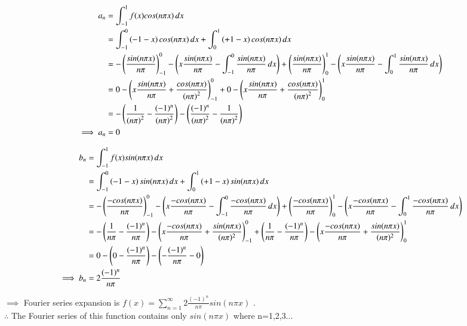 \documentclass[journal,12pt,onecolumn]{IEEEtran}
\theoremstyle{remark}
\begin{document}
\begin{align}
{a_n} &= \int_{-1}^{1} f(x) cos(n \pi x) \, dx \\
&= \int_{-1}^{0} \left(-1-x\right)cos(n \pi x) \, dx + \int_{0}^{1} \left(+1-x\right)cos(n \pi x) \, dx \\
&= -\left(\frac{sin(n \pi x)}{n \pi}\right)_{-1}^{0} -\left(x \frac{sin(n \pi x)}{n \pi} - \int_{-1}^{0}\frac{sin(n \pi x)}{n \pi}  \, dx \right)  + \left(\frac{sin(n \pi x)}{n \pi}\right)_{0}^{1} -\left(x \frac{sin(n \pi x)}{n \pi} - \int_{0}^{1}\frac{sin(n \pi x)}{n \pi}  \, dx\right) \\
&= 0 -\left(x \frac{sin(n \pi x)}{n \pi} + \frac{cos(n \pi x)}{\left(n \pi\right)^2}\right)_{-1}^{0} + 0 -  \left(x \frac{sin(n \pi x)}{n \pi} + \frac{cos(n \pi x)}{\left(n \pi\right)^2}\right)_{0}^{1} \\
&= - \left(\frac{1}{\left(n \pi\right)^2} - \frac{(-1)^n}{\left(n \pi\right)^2}\right) - \left(\frac{(-1)^n}{\left(n \pi\right)^2} - \frac{1}{\left(n \pi\right)^2}\right) \\
\implies {a_n}&= 0
\end{align}

\begin{align}
{b_n} &= \int_{-1}^{1} f(x) sin(n \pi x) \, dx \\
&= \int_{-1}^{0} \left(-1-x\right)sin(n \pi x) \, dx + \int_{0}^{1} \left(+1-x\right)sin(n \pi x) \, dx \\
&= -\left(\frac{-cos(n \pi x)}{n \pi}\right)_{-1}^{0} -\left(x \frac{-cos(n \pi x)}{n \pi} -\int_{-1}^{0}\frac{-cos(n \pi x)}{n \pi}  \, dx \right)  + \left(\frac{-cos(n \pi x)}{n \pi}\right)_{0}^{1} -\left(x \frac{-cos(n \pi x)}{n \pi} - \int_{0}^{1}\frac{-cos(n \pi x)}{n \pi}  \, dx\right) \\
&= -\left(\frac{1}{n \pi} - \frac{(-1)^n}{n \pi}\right) -\left(x \frac{-cos(n \pi x)}{n \pi}+ \frac{sin(n \pi x)}{(n \pi)^2}\right)_{-1}^{0} +
\left(\frac{1}{n \pi} - \frac{(-1)^n}{n \pi}\right) -\left(x \frac{-cos(n \pi x)}{n \pi}+ \frac{sin(n \pi x)}{(n \pi)^2}\right)_{0}^{1} \\
&= 0-\left(0 - \frac{(-1)^n}{n \pi}\right) -\left(- \frac{(-1)^n}{n \pi} - 0 \right) \\
\implies {b_n}&= 2 \frac{(-1)^n}{n \pi}
\end{align}

 $\implies$ Fourier series expansion is $f(x) = \sum_{n=1}^{\infty} 2 \frac{(-1)^n}{n \pi}sin(n \pi x)$ . \\
 $\therefore$ The Fourier series of this function contains only $sin(n\pi x)$ where n=1,2,3...
 
\end{document}
